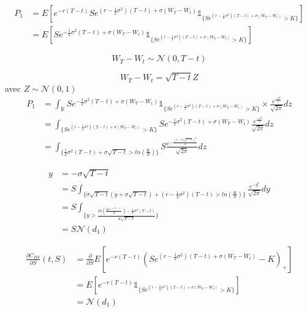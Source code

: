 \documentclass{article}
\theoremstyle{plain}
\theoremstyle{definition}
\begin{document}
\begin{equation}
\begin{split}
P_1&=E[e^{-r(T-t)}Se^{(r-\frac{1}{2}\sigma^2)(T-t)+\sigma(W_T-W_t)}\mathds{1}_{\{Se^{(r-\frac{1}{2}\sigma^2)(T-t)+\sigma(W_T-W_t)}>K\}}]\\
&=E[Se^{-\frac{1}{2}\sigma^2(T-t)+\sigma(W_T-W_t)}\mathds{1}_{\{Se^{(r-\frac{1}{2}\sigma^2)(T-t)+\sigma(W_T-W_t)}>K\}}]
\end{split}
\end{equation}

\begin{equation}
W_T-W_t\sim\mathcal{N}(0,T-t)
\end{equation}

\begin{equation}
W_T-W_t=\sqrt{T-t}Z
\end{equation}
avec $Z\sim \mathcal{N}(0,1)$
\begin{equation}
\begin{split}
P_1&=\int_{\mathbb{R}}Se^{-\frac{1}{2}\sigma^2(T-t)+\sigma(W_T-W_t)}\mathds{1}_{\{Se^{(r-\frac{1}{2}\sigma^2)(T-t)+\sigma(W_T-W_t)}>K\}}\times \frac{e^{\frac{-z^2}{2}}}{\sqrt{2\pi}}dz\\
&=\int_{\{Se^{(r-\frac{1}{2}\sigma^2)(T-t)+\sigma(W_T-W_t)}>K\}} Se^{-\frac{1}{2}\sigma^2(T-t)+\sigma(W_T-W_t)}\frac{e^{\frac{-z^2}{2}}}{\sqrt{2\pi}}dz\\
&=\int_{\{\frac{1}{2}\sigma^2(T-t)+\sigma\sqrt{T-t}>ln(\frac{K}{S})\}} S\frac{e^{-\frac{(z-\sigma\sqrt{T-t})^2}{2}}}{\sqrt{2\pi}}dz
\end{split}
\end{equation}

\begin{equation}
\begin{split}
y&=-\sigma\sqrt{T-t}\\
&=S\int_{\{\sigma\sqrt{T-t}(y+\sigma\sqrt{T-t})+(r-\frac{1}{2}\sigma^2)(T-t)>ln(\frac{K}{S})\}}\frac{e^{-y^2}}{\sqrt{2\pi}}dy\\
&=S\int_{\{y>\frac{ln(\frac{Ke^{-r(T-t)}}{S})-\frac{1}{2}\sigma^2(T-t)}{\sigma\sqrt{T-t}}\}}\\
&=S\mathcal{N}(d_1)
\end{split}
\end{equation}

\begin{equation}
\begin{split}
\frac{\partial C_{BS}}{\partial S}(t,S)&=\frac{\partial}{\partial S}E[e^{-r(T-t)}(Se^{(r-\frac{1}{2}\sigma^2)(T-t)+\sigma(W_T-W_t)}-K)_+]\\
&=E[e^{-r(T-t)}\mathds{1}_{\{Se^{(r-\frac{1}{2}\sigma^2)(T-t)+\sigma(W_T-W_t)}>K\}}]\\
&=\mathcal{N}(d_1)
\end{split}
\end{equation}
\end{document}
